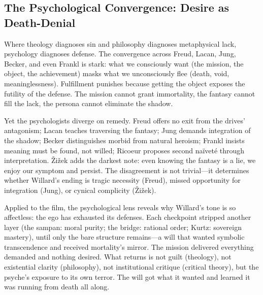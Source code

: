 \subsection*{The Psychological Convergence: Desire as Death-Denial}
\label{ssec:vi-synthesis}

Where theology diagnoses sin and philosophy diagnoses metaphysical lack, psychology diagnoses
defense. The convergence across Freud, Lacan, Jung, Becker, and even Frankl is stark: what we
consciously want (the mission, the object, the achievement) masks what we unconsciously flee
(death, void, meaninglessness). Fulfillment punishes because getting the object exposes the
futility of the defense. The mission cannot grant immortality, the fantasy cannot fill the
lack, the persona cannot eliminate the shadow.

Yet the psychologists diverge on remedy. Freud offers no exit from the drives' antagonism;
Lacan teaches traversing the fantasy; Jung demands integration of the shadow; Becker
distinguishes morbid from natural heroism; Frankl insists meaning must be found, not willed;
Ricoeur proposes second naïveté through interpretation. {\v{Z}}i{\v{z}}ek adds the darkest
note: even knowing the fantasy is a lie, we enjoy our symptom and persist. The disagreement is
not trivial---it determines whether Willard's ending is tragic necessity (Freud), missed
opportunity for integration (Jung), or cynical complicity ({\v{Z}}i{\v{z}}ek).

Applied to the film, the psychological lens reveals why Willard's tone is so affectless: the
ego has exhausted its defenses. Each checkpoint stripped another layer (the sampan: moral
purity; the bridge: rational order; Kurtz: sovereign mastery), until only the bare structure
remains---a will that wanted symbolic transcendence and received mortality's mirror. The
mission delivered everything demanded and nothing desired. What returns is not guilt
(theology), not existential clarity (philosophy), not institutional critique (critical theory),
but the psyche's exposure to its own terror. The will got what it wanted and learned it was
running from death all along.
